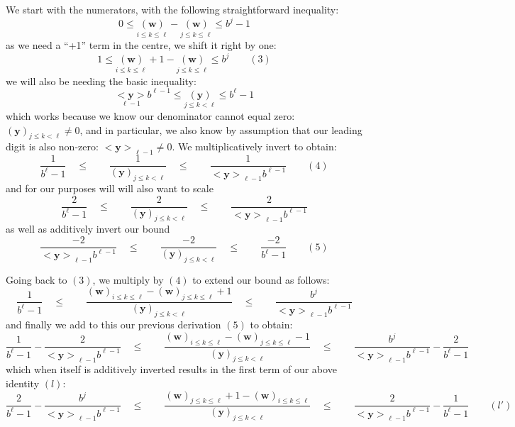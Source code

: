 \documentclass[twoside]{article}
\renewcommand{\leq}{\ensuremath{\quad\le\qquad}}
\newcommand{\bseq}[1][u]{\ensuremath{<\!\!\bm{#1}\!\!>}}
\newcommand{\bunderseq}[2][u]{\ensuremath{\underset{#2}{<\!\!\bm{#1}\!\!>}}}
\newcommand{\bradix}[2][u]{\ensuremath{\underset{#2}{(\bm{#1})}}}
\newcommand{\numer}[3][w]{\ensuremath{(\bm{#1})_{#2\le k\le #3}}}
\newcommand{\denom}[3][y]{\ensuremath{(\bm{#1})_{#2\le k <  #3}}}
\begin{document}
We start with the numerators, with the following straightforward inequality:
$$ 0\le\bradix[w]{i\le k\le\ell}-\bradix[w]{j\le k\le\ell}\le b^j-1 $$
as we need a ``+1'' term in the centre, we shift it right by one:
$$ 1\le\bradix[w]{i\le k \le\ell}+1-\bradix[w]{j\le k\le\ell}\le b^j\qquad (3) $$
we will also be needing the basic inequality:
$$ \bunderseq[y]{\ell-1}b^{\ell-1}\le\bradix[y]{j\le k < \ell}\le b^\ell-1 $$
which works because we know our denominator cannot equal zero: $ \denom{j}{\ell}\neq 0 $, and in
particular, we also know by assumption that our leading digit is also non-zero: $ \bseq[y]_{\ell-1}\neq 0 $.
We multiplicatively invert to obtain:
$$ \frac{1}{b^\ell-1}\leq\frac{1}{\denom{j}{\ell}}\leq\frac{1}{\bseq[y]_{\ell-1}b^{\ell-1}}\qquad (4) $$
and for our purposes will will also want to scale
$$ \frac{2}{b^\ell-1}\leq\frac{2}{\denom{j}{\ell}}\leq\frac{2}{\bseq[y]_{\ell-1}b^{\ell-1}} $$
as well as additively invert our bound
$$ \frac{-2}{\bseq[y]_{\ell-1}b^{\ell-1}}\leq\frac{-2}{\denom{j}{\ell}}\leq\frac{-2}{b^\ell-1}\qquad (5) $$

Going back to $ (3) $, we multiply by $ (4) $ to extend our bound as follows:
$$ \frac{1}{b^\ell-1}\leq\frac{\numer{i}{\ell}-\numer{j}{\ell}+1}{\denom{j}{\ell}}\leq\frac{b^j}{\bseq[y]_{\ell-1}b^{\ell-1}} $$
and finally we add to this our previous derivation $ (5) $ to obtain:
$$ \frac{1}{b^\ell-1}-\frac{2}{\bseq[y]_{\ell-1}b^{\ell-1}}
	\leq\frac{\numer{i}{\ell}-\numer{j}{\ell}-1}{\denom{j}{\ell}}
	\leq\frac{b^j}{\bseq[y]_{\ell-1}b^{\ell-1}}-\frac{2}{b^\ell-1} $$
which when itself is additively inverted results in the first term of our above identity $ (l) $:
$$ \frac{2}{b^\ell-1}-\frac{b^j}{\bseq[y]_{\ell-1}b^{\ell-1}}
	\leq\frac{\numer{j}{\ell}+1-\numer{i}{\ell}}{\denom{j}{\ell}}
	\leq\frac{2}{\bseq[y]_{\ell-1}b^{\ell-1}}-\frac{1}{b^\ell-1}\qquad (l') $$
\end{document}
